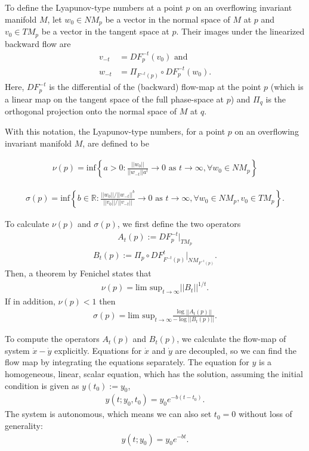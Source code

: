 \begin{solution}[9.4]
To define the Lyapunov-type numbers at a point $p$ on an overflowing invariant manifold $M$, let $w_0\in NM_p$ be a vector in the normal space of $M$ at $p$ and $v_0\in TM_p$ be a vector in the tangent space at $p$. Their images under the linearized backward flow are 
\begin{align}
    v_{-t} &= DF^{-t}_p(v_0) \text{ and } \\
    w_{-t} &= \Pi_{F^{-t}(p)}\circ DF^{-t}_p(w_0). 
\end{align}
Here, $DF^{-t}_p$ is the differential of the (backward) flow-map at the point $p$ (which is a linear map on the tangent space of the full phase-space at $p$) and $\Pi_q$ is the orthogonal projection onto the normal space of $M$ at $q$. 


With this notation, the Lyapunov-type numbers, for a point $p$ on an overflowing invariant manifold $M$, are defined to be

\begin{align}
    \nu(p) = \text{inf}\left\{a>0: \frac{||w_{0}||}{|| w_{-t}||a^t} \to 0 \text{ as } t \to \infty, \forall w_0 \in NM_p \right\}
\end{align}

\begin{align}
    \sigma(p) = \text{inf} \left\{ b \in \mathbb{R}: \frac{||w_0||/ ||w_{-t}||^b}{||v_0||/||v_{-t}||} \to 0 \text{ as } t\to \infty, \forall w_0\in NM_p, v_0 \in TM_p \right\}.
\end{align}

To calculate $\nu(p)$ and $\sigma(p)$, we first define the two operators
\begin{align}
    A_t(p) := DF_p^{-t}|_{TM_p}
\end{align}
\begin{align}
    B_t(p) := \Pi_p \circ DF_{F^{-t}(p)}^{t}|_{NM_{F^{-t}(p)}}.
\end{align}
Then, a theorem by Fenichel states that
\begin{align}
    \nu(p) = \text{lim sup}_{t\to \infty} ||B_t||^{1/t}. \label{eqnu}
\end{align}
If in addition, $\nu(p)<1$ then
\begin{align}
    \sigma(p) = \text{lim sup}_{t\to \infty} \frac{\log ||A_t(p)||}{-\log ||B_t(p)||}. \label{eqsigma}
\end{align}

To compute the operators $A_t(p)$ and $B_t(p)$, we calculate the flow-map of system $\dot{x}-\dot{y}$ explicitly. Equations for $\dot{x}$ and $\dot{y}$ are decoupled, so we can find the flow map by integrating the equations separately. The equation for $y$ is a homogeneous, linear, scalar equation, which has the solution, assuming the initial condition is given as $y(t_0):= y_0$,
\begin{align}
y(t;y_0,t_0) = y_0e^{-b(t-t_0)}.
\end{align}
The system is autonomous, which means we can also set $t_0 = 0$ without loss of generality:
\begin{align}
\label{eq94y}
y(t;y_0) = y_0e^{-bt}.
\end{align}


\end{solution}
